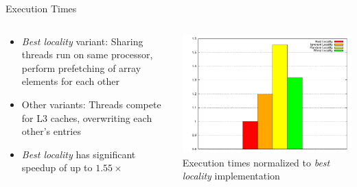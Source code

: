 \begin{frame}{Execution Times}
  \begin{columns}[c]
    \begin{column}{0.49\textwidth}
      \begin{itemize}
      \item \emph{Best locality} variant: Sharing threads run on same
        processor, perform prefetching of array elements for each
        other
      \item Other variants: Threads compete for L3 caches, overwriting
        each other's entries
      \item \emph{Best locality} has significant speedup of up to
        $1.55\times$
  \end{itemize}
    \end{column}
    \begin{column}{0.51\textwidth}
      \begin{center}
        \includegraphics[width=\textwidth]{figures/cache-stress-test} \\
        \tiny{Execution times normalized to \emph{best locality}
          implementation}
      \end{center}
    \end{column}
  \end{columns}
\end{frame}

